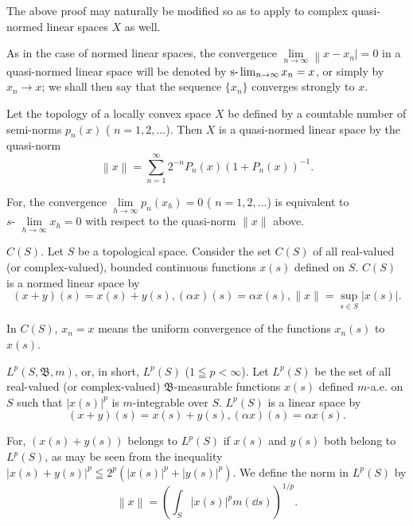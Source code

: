 \begin{remarku} The above proof may naturally be modified so as to apply to complex quasi-normed linear spaces $X$ as well. 
\end{remarku}

As in the case of normed linear spaces, the convergence $\lim\limits_{n\to\infty}\left\|x-x_{n}\right|=0$ in a quasi-normed linear space will be denoted by $\text{s-}\lim\nolimits_{n\to\infty}x_{n}=x$, or simply by $x_{n}\to x$; we shall then say that the sequence $\{x_{n}\}$ converges strongly to $x$. 

\begin{examplen} Let the topology of a locally convex space $X$ be defined by a countable number of semi-norms $p_{n}(x)$ ( $n = 1, 2, \ldots$). Then $X$ is a quasi-normed linear space by the quasi-norm
\[
\left\| x \right\| = \sum\limits_{n=1} ^{\infty} 2 ^{-n} P_{n} (x) (1 + P_{n} (x)) ^{-1}.
\]

For, the convergence $\lim\limits_{h\to \infty}p_n(x_h) = 0$ ( $n = 1,2,\ldots$) is equivalent to $s\text{- }\lim\limits_{h\to \infty}x_h = 0$ with respect to the quasi-norm $\|x\|$ above. 


\end{examplen}
\label{sec:I.3}

\begin{example}\label{ex:I.3.Example.1} $C(S)$. Let $S$ be a topological space. Consider the set $C(S)$ of all real-valued (or complex-valued), bounded continuous functions $x(s)$ defined on $S$. $C(S)$ is a normed linear space by 
\[
(x + y) (s) = x (s) + y (s), (\alpha x) (s) = \alpha x (s), \| x \| = \sup\limits_{s \in S} | x (s) |.
\]
\end{example}

In $C(S)$, \slim $x_{n} = x$ means the uniform convergence of the functions $x_{n}(s)$ to $x(s)$. 

\begin{example}\label{ex:I.3.Example.2} $L^p(S, \mathfrak{B}, m)$, or, in short, $L^p(S)$ ($1 \leqq p < \infty$). Let $L^p(S)$ be the set of all real-valued (or complex-valued) $\mathfrak{B}$-measurable functions $x(s)$ defined $m$-a.e. on $S$ such that $|x(s)|^p$ is $m$-integrable over $S$. $L^p(S)$ is a linear space by 
\[
(x + y) (s) = x (s) + y (s), (\alpha x) (s) = \alpha x (s).
\]
\end{example}

For, $(x(s) + y(s))$ belongs to $L^p(S)$ if $x(s)$ and $y(s)$ both belong to $L^p(S)$, as may be seen from the inequality $|x(s) + y(s)|^p\leqq 2^p(|x(s)|^p+ |y(s)|^p)$. We define the norm in $L^p(S)$ by 
\begin{equation}\label{eq:I.3.1}
\left\| x \right\| = \left(\int_{S} | x (s) | ^{p} m (\dd s)\right) ^{1/p}.
\end{equation}

